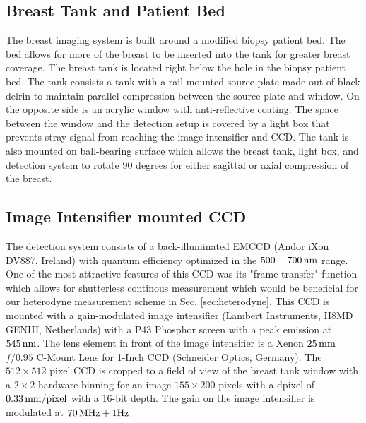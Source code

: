 \subsection{Breast Tank and Patient Bed}
The breast imaging system is built around a modified biopsy patient bed. The bed allows for more of the breast to be inserted into the tank for greater breast coverage. The breast tank is located right below the hole in the biopsy patient bed. The tank consists a tank with a rail mounted source plate made out of black delrin to maintain parallel compression between the source plate and window. On the opposite side is an acrylic window with anti-reflective coating. The space between the window and the detection setup is covered by a light box that prevents stray signal from reaching the image intensifier and CCD. The tank is also mounted on ball-bearing surface which allows the breast tank, light box, and detection system to rotate 90 degrees for either sagittal or axial compression of the breast.


\subsection{Image Intensifier mounted CCD}
The detection system consists of a back-illuminated EMCCD (Andor iXon DV887, Ireland) with quantum efficiency optimized in the $500-700\,{\rm nm}$ range. One of the most attractive features of this CCD was its "frame transfer" function which allows for shutterless continous measurement which would be beneficial for our heterodyne measurement scheme in Sec. \ref{sec:heterodyne}. This CCD is mounted with a gain-modulated image intensifier (Lambert Instruments, II8MD GENIII, Netherlands) with a P43 Phosphor screen with a peak emission at $545\, {\rm nm}$. The lens element in front of the image intensifier is a Xenon $25\,{\rm mm}$ $f/0.95$ C-Mount Lens for 1-Inch CCD (Schneider Optics, Germany). The $512 \times 512$ pixel CCD is cropped to a field of view of the breast tank window with a $2 \times 2$ hardware binning for an image $155 \times 200$ pixels with a dpixel of $0.33\, {\rm mm/pixel}$ with a 16-bit depth. The gain on the image intensifier is modulated at  $70\,{\rm MHz} + 1 {\rm Hz}$

